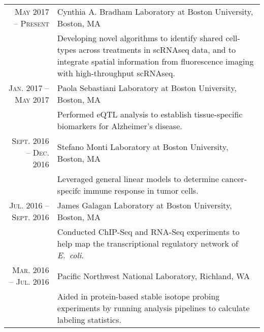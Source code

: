 \documentclass[a4paper,10pt]{article}
\begin{document}
\section{\color{linkcolour}{Research}}
\begin{tabular}{rp{10cm}}
	\textsc{May 2017 -- Present}     & Cynthia A. Bradham Laboratory at Boston University, Boston, MA                               \\
	                                 & \footnotesize{Developing novel algorithms to identify shared cell-types across treatments
		in scRNAseq data, and to integrate spatial information from fluorescence
	imaging with high-throughput scRNAseq.}                                                                                         \\
	\textsc{Jan. 2017 -- May 2017}   & Paola Sebastiani Laboratory at Boston University, Boston, MA                                 \\
	                                 & \footnotesize{Performed eQTL analysis to establish tissue-specific biomarkers for
	Alzheimer's disease.}                                                                                                           \\
	\textsc{Sept. 2016 -- Dec. 2016} & Stefano Monti Laboratory at Boston University, Boston, MA                                    \\
	                                 & \footnotesize{Leveraged general linear models to determine cancer-specifc immune response in
	tumor cells.}                                                                                                                   \\
	\textsc{Jul. 2016 -- Sept. 2016} & James Galagan Laboratory at Boston University, Boston, MA                                    \\
	                                 & \footnotesize{Conducted ChIP-Seq and RNA-Seq experiments to help map the transcriptional
	regulatory network of \emph{E.\ coli}.}                                                                                         \\
	\textsc{Mar. 2016 -- Jul. 2016}  & Pacific Northwest National Laboratory, Richland, WA                                          \\
	                                 & \footnotesize{Aided in protein-based stable isotope probing experiments by
	running analysis pipelines to  calculate labeling statistics.}                                                                  \\

\end{tabular}
\end{document}
